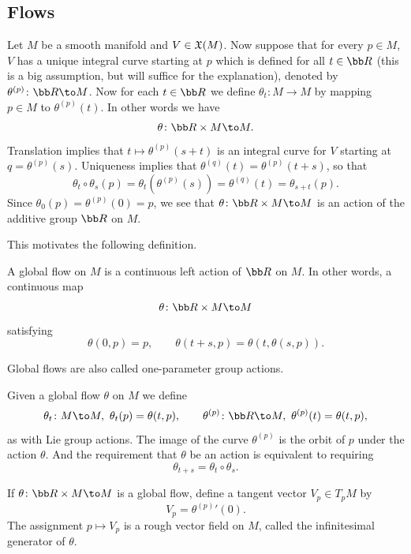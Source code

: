 \eproof

\subsection{Flows}

Let $M$ be a smooth manifold and $V\in{\frak X}(M)$.
Now suppose that for every $p\in M$, $V$ has a unique integral curve starting at $p$ which is defined for all $t\in\bR$ (this is a big assumption,
but will suffice for the explanation), denoted by $\theta^{(p)}\colon\bR\to M$.
Now for each $t\in\bR$ we define $\theta_t\colon M\to M$ by mapping $p\in M$ to $\theta^{(p)}(t)$.
In other words we have
$$ \theta\colon\bR\times M\to M . $$
Translation implies that $t\mapsto\theta^{(p)}(s+t)$ is an integral curve for $V$ starting at $q=\theta^{(p)}(s)$.
Uniqueness implies that $\theta^{(q)}(t)=\theta^{(p)}(t+s)$, so that
$$ \theta_t\circ\theta_s(p) = \theta_t(\theta^{(p)}(s)) = \theta^{(q)}(t) = \theta_{s+t}(p) . $$
Since $\theta_0(p)=\theta^{(p)}(0)=p$, we see that $\theta\colon\bR\times M\to M$ is an action of the additive group $\bR$ on $M$.

This motivates the following definition.

\bdefn

    A {\emphcolor global flow} on $M$ is a continuous left action of $\bR$ on $M$.
    In other words, a continuous map
    $$ \theta\colon\bR\times M\to M $$
    satisfying
    $$ \theta(0,p) = p,\qquad \theta(t+s,p) = \theta(t,\theta(s,p)) . $$

\edefn

\bnote

    Global flows are also called {\emphcolor one-parameter group actions}.

\enote

Given a global flow $\theta$ on $M$ we define
$$ \theta_t\colon M\to M,\ \theta_t(p)=\theta(t,p),\qquad \theta^{(p)}\colon\bR\to M,\ \theta^{(p)}(t)=\theta(t,p) , $$
as with Lie group actions.
The image of the curve $\theta^{(p)}$ is the orbit of $p$ under the action $\theta$.
And the requirement that $\theta$ be an action is equivalent to requiring
$$ \theta_{t+s} = \theta_t\circ\theta_s . $$

If $\theta\colon\bR\times M\to M$ is a global flow, define a tangent vector $V_p\in T_pM$ by
$$ V_p = {\theta^{(p)}}'(0) . $$
The assignment $p\mapsto V_p$ is a rough vector field on $M$, called the {\emphcolor infinitesimal generator} of $\theta$.

\bprop

